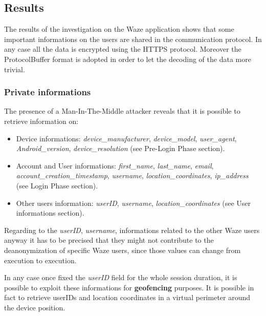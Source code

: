 	\subsection{Results}
		\par The results of the investigation on the Waze application shows that some important informations on the users are shared in the communication protocol. In any case all the data is encrypted using the HTTPS protocol. Moreover the ProtocolBuffer format is adopted in order to let the decoding of the data more trivial. 
	\subsubsection{Private informations}
	\par The presence of a Man-In-The-Middle attacker reveals that it is possible to retrieve information on:
		\begin{itemize}
			\item Device informations: \textit{device\_manufacturer}, \textit{device\_model}, \textit{user\_agent}, \textit{Android\_version}, \textit{device\_resolution} (see Pre-Login Phase section). 
			\item Account and User informations: \textit{first\_name}, \textit{last\_name}, \textit{email}, \textit{account\_creation\_timestamp}, \textit{username}, \textit{location\_coordinates}, \textit{ip\_address} (see Login Phase section).     
			\item Other users information: \textit{userID}, \textit{username}, \textit{location\_coordinates} (see User informations section).
		\end{itemize}
		Regarding to the \textit{userID}, \textit{username}, informations related to the other Waze users anyway it has to be precised that they might not contribute to the deanonymization of specific Waze users, since those values can change from execution to execution.\newline
		\par In any case once fixed the \textit{userID} field for the whole session duration, it is possible to exploit these informations for \textbf{geofencing} purposes. It is possible in fact to retrieve userIDs and location coordinates in a virtual perimeter around the device position. 
	
